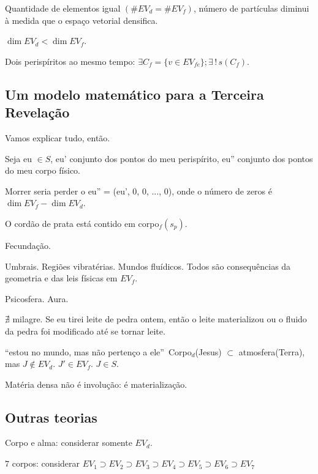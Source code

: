 \documentclass[12pt,a4paper]{article}
\begin{document}
			Quantidade de elementos igual $(\#EV_d = \#EV_f)$, n\'umero de part\'iculas diminui \`a medida que o espa\c{c}o vetorial densifica.

			$\dim EV_d < \dim EV_f$.

			Dois perisp\'iritos ao mesmo tempo: $\exists C_f = \{v \in EV_{fe}\} ; \exists\,!\,s(C_f)$.

			\subsection{Um modelo matem\'atico para a Terceira Revela\c{c}\~ao}

			\begin{flushright}
			\end{flushright}

			Vamos explicar tudo, ent\~ao.

			Seja eu $\in S$, eu' conjunto dos pontos do meu perisp\'irito, eu'' conjunto dos pontos do meu corpo f\'isico.

			Morrer seria perder o eu'' = (eu', 0, 0, ..., 0), onde o n\'umero de zeros \'e $\dim EV_f - \dim EV_d$.

			O cord\~ao de prata est\'a contido em corpo$_f(s_p)$.

			Fecunda\c{c}\~ao.

			Umbrais. Regi\~oes vibrat\'erias. Mundos flu\'idicos. Todos s\~ao consequ\^encias da geometria e das leis f\'isicas em $EV_f$.

			Psicosfera. Aura.

			$\nexists$ milagre. Se eu tirei leite de pedra ontem, ent\~ao o leite materializou ou o fluido da pedra foi modificado at\'e se tornar leite.

			\textquotedblleft estou no mundo, mas n\~ao perten\c{c}o a ele\textquotedblright\, Corpo$_d$(Jesus) $\subset$ atmosfera(Terra), mas $J \notin EV_d$. $J' \in EV_f$. $J \in S$.

			Mat\'eria densa n\~ao \'e involu\c{c}\~ao: \'e materializa\c{c}\~ao.

			\subsection{Outras teorias}

			\begin{flushright}
			\end{flushright}

			Corpo e alma: considerar somente $EV_d$.

			$7$ corpos: considerar $EV_1 \supset EV_2 \supset EV_3 \supset EV_4 \supset EV_5 \supset EV_6 \supset EV_7$
\end{document}
